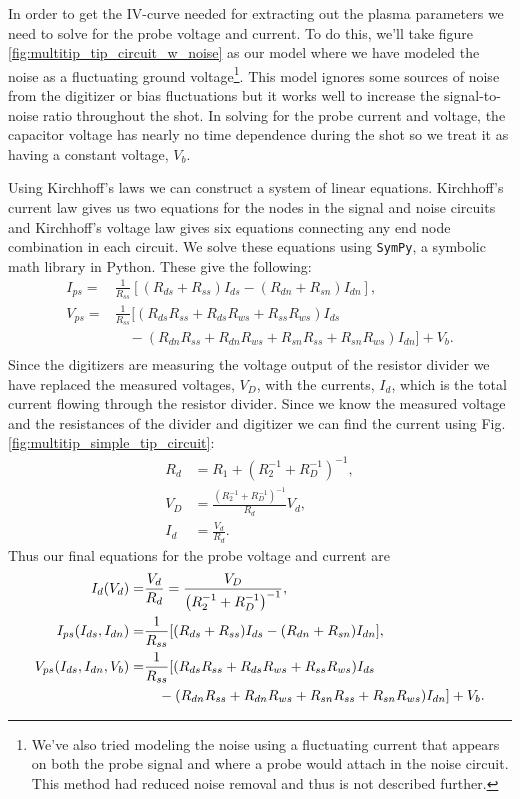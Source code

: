 In order to get the IV-curve needed for extracting out the plasma parameters we need to solve for the probe voltage and current. To do this, we'll take figure \ref{fig:multitip_tip_circuit_w_noise} as our model where we have modeled the noise as a fluctuating ground voltage\footnote{We've also tried modeling the noise using a fluctuating current that appears on both the probe signal and where a probe would attach in the noise circuit. This method had reduced noise removal and thus is not described further.}. This model ignores some sources of noise from the digitizer or bias fluctuations but it works well to increase the signal-to-noise ratio throughout the shot. In solving for the probe current and voltage, the capacitor voltage has nearly no time dependence during the shot so we treat it as having a constant voltage, $V_b$.

Using Kirchhoff's laws we can construct a system of linear equations. Kirchhoff's current law gives us two equations for the nodes in the signal and noise circuits and Kirchhoff's voltage law gives six equations connecting any end node combination in each circuit. We solve these equations using \texttt{SymPy}, a symbolic math library in Python. These give the following:
\begin{align*}
  I_{ps} =& \frac{1}{R_{ss}} [(R_{ds} + R_{ss}) I_{ds} - (R_{dn} + R_{sn}) I_{dn}], \\
  V_{ps} =& \frac{1}{R_{ss}} [(R_{ds} R_{ss} + R_{ds} R_{ws} + R_{ss} R_{ws}) I_{ds} \\
  & \quad - (R_{dn} R_{ss} + R_{dn} R_{ws} + R_{sn} R_{ss} + R_{sn} R_{ws}) I_{dn}] + V_b. \\
\end{align*}
Since the digitizers are measuring the voltage output of the resistor divider we have replaced the measured voltages, $V_D$, with the currents, $I_d$, which is the total current flowing through the resistor divider. Since we know the measured voltage and the resistances of the divider and digitizer we can find the current using Fig. \ref{fig:multitip_simple_tip_circuit}:
\begin{align*}
  R_d &= R_1 + (R_2^{-1} + R_D^{-1})^{-1}, \\
  V_D &= \frac{(R_2^{-1} + R_D^{-1})^{-1}}{R_d} V_d, \\
  I_d &= \frac{V_d}{R_d}.
\end{align*}
Thus our final equations for the probe voltage and current are
\begin{align}
  I_d(V_d) =& \frac{V_d}{R_d} = \frac{V_D}{\left(R_2^{-1} + R_D^{-1}\right)^{-1}} \label{eq:multitip_I_d},\\
  I_{ps}(I_{ds}, I_{dn}) =& \frac{1}{R_{ss}} [(R_{ds} + R_{ss}) I_{ds} - (R_{dn} + R_{sn}) I_{dn}] \label{eq:multitip_I_p}, \\
  V_{ps}(I_{ds}, I_{dn}, V_b) =& \frac{1}{R_{ss}} [(R_{ds} R_{ss} + R_{ds} R_{ws} + R_{ss} R_{ws}) I_{ds} \label{eq:multitip_V_p} \\
  & \quad - (R_{dn} R_{ss} + R_{dn} R_{ws} + R_{sn} R_{ss} + R_{sn} R_{ws}) I_{dn}] + V_b \notag.
\end{align}

